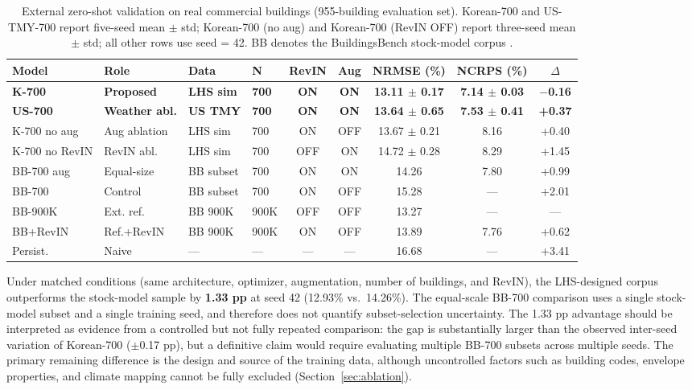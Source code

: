 \documentclass[preprint,12pt,authoryear]{elsarticle}
\begin{document}
\begin{table}[htbp]
\caption{External zero-shot validation on real commercial buildings (955-building evaluation set). Korean-700 and US-TMY-700 report five-seed mean $\pm$ std; Korean-700 (no aug) and Korean-700 (RevIN OFF) report three-seed mean $\pm$ std; all other rows use seed = 42. BB denotes the BuildingsBench stock-model corpus \citep{Emami2023}.}
\label{tab:main}
\centering
\small
\begin{tabular}{llllccccc}
\toprule
Model & Role & Data & N & RevIN & Aug & NRMSE (\%) & NCRPS (\%) & $\Delta$ \\
\midrule
\textbf{K-700} & \textbf{Proposed} & \textbf{LHS sim} & \textbf{700} & \textbf{ON} & \textbf{ON} & \textbf{13.11 $\pm$ 0.17} & \textbf{7.14 $\pm$ 0.03} & \textbf{$-$0.16} \\
\textbf{US-700} & \textbf{Weather abl.} & \textbf{US TMY} & \textbf{700} & \textbf{ON} & \textbf{ON} & \textbf{13.64 $\pm$ 0.65} & \textbf{7.53 $\pm$ 0.41} & \textbf{+0.37} \\
K-700 no aug & Aug ablation & LHS sim & 700 & ON & OFF & 13.67 $\pm$ 0.21 & 8.16 & +0.40 \\
K-700 no RevIN & RevIN abl. & LHS sim & 700 & OFF & ON & 14.72 $\pm$ 0.28 & 8.29 & +1.45 \\
BB-700 aug & Equal-size & BB subset & 700 & ON & ON & 14.26 & 7.80 & +0.99 \\
BB-700 & Control & BB subset & 700 & ON & OFF & 15.28 & --- & +2.01 \\
BB-900K & Ext. ref. & BB 900K & 900K & OFF & OFF & 13.27 & --- & --- \\
BB+RevIN & Ref.+RevIN & BB 900K & 900K & ON & OFF & 13.89 & 7.76 & +0.62 \\
Persist. & Naive & --- & --- & --- & --- & 16.68 & --- & +3.41 \\
\bottomrule
\end{tabular}
\end{table}

Under matched conditions (same architecture, optimizer, augmentation, number of buildings, and RevIN), the LHS-designed corpus outperforms the stock-model sample by \textbf{1.33 pp} at seed 42 (12.93\% vs.\ 14.26\%). The equal-scale BB-700 comparison uses a single stock-model subset and a single training seed, and therefore does not quantify subset-selection uncertainty. The 1.33 pp advantage should be interpreted as evidence from a controlled but not fully repeated comparison: the gap is substantially larger than the observed inter-seed variation of Korean-700 ($\pm$0.17 pp), but a definitive claim would require evaluating multiple BB-700 subsets across multiple seeds. The primary remaining difference is the design and source of the training data, although uncontrolled factors such as building codes, envelope properties, and climate mapping cannot be fully excluded (Section~\ref{sec:ablation}).
\end{document}

